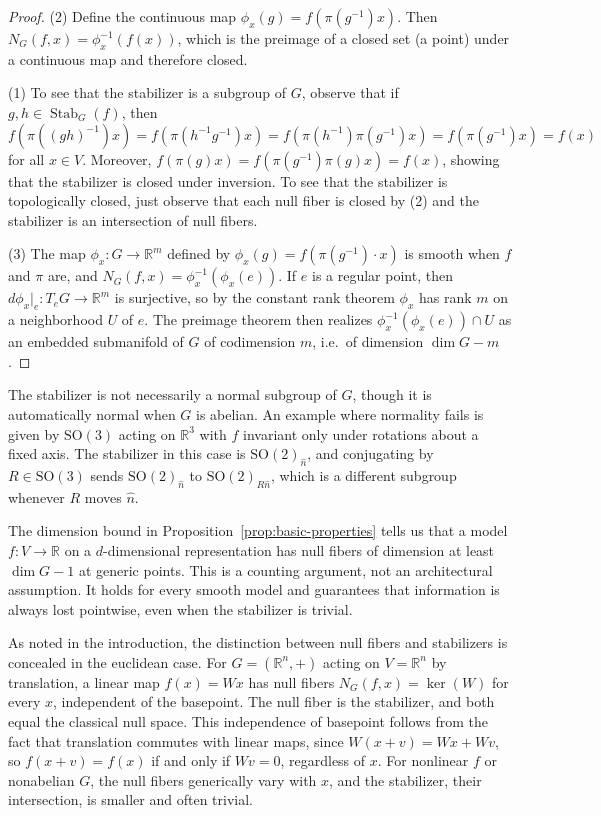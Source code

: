 \documentclass[11pt]{article}
\DeclareMathOperator{\kernel}{ker}
\DeclareMathOperator{\Stab}{Stab}
\newcommand{\RR}{\mathbb{R}}
\begin{document}
\begin{proof}
(2) Define the continuous map $\phi_x(g)=f(\pi(g^{-1})x)$. Then $N_G(f,x)=\phi_x^{-1}(f(x))$, which is the preimage of a closed set (a point) under a continuous map and therefore closed.

(1) To see that the stabilizer is a subgroup of $G$, observe that if $g,h\in\Stab_G(f)$, then $f(\pi((gh)^{-1})x)=f(\pi(h^{-1}g^{-1})x)=f(\pi(h^{-1})\pi(g^{-1})x)=f(\pi(g^{-1})x)=f(x)$ for all $x\in V$. Moreover, $f(\pi(g)x)=f(\pi(g^{-1})\pi(g)x)=f(x)$, showing that the stabilizer is closed under inversion. To see that the stabilizer is topologically closed, just observe that each null fiber is closed by (2) and the stabilizer is an intersection of null fibers.

(3) The map $\phi_x\colon G \to \RR^m$ defined by $\phi_x(g) = f(\pi(g^{-1}) \cdot x)$ is smooth when $f$ and $\pi$ are, and $N_G(f, x) = \phi_x^{-1}(\phi_x(e))$. If $e$ is a regular point, then $d\phi_x|_e\colon T_e G \to \RR^m$ is surjective, so by the constant rank theorem $\phi_x$ has rank $m$ on a neighborhood $U$ of $e$. The preimage theorem then realizes $\phi_x^{-1}(\phi_x(e)) \cap U$ as an embedded submanifold of $G$ of codimension $m$, i.e.\ of dimension $\dim G - m$.
\end{proof}

The stabilizer is not necessarily a normal subgroup of $G$, though it is automatically normal when $G$ is abelian. An example where normality fails is given by $\mathrm{SO}(3)$ acting on $\RR^3$ with $f$ invariant only under rotations about a fixed axis. The stabilizer in this case is $\mathrm{SO}(2)_{\hat{n}}$, and conjugating by $R \in \mathrm{SO}(3)$ sends $\mathrm{SO}(2)_{\hat{n}}$ to $\mathrm{SO}(2)_{R\hat{n}}$, which is a different subgroup whenever $R$ moves $\hat{n}$.

The dimension bound in Proposition~\ref{prop:basic-properties} tells us that a model $f\colon V \to \RR$ on a $d$-dimensional representation has null fibers of dimension at least $\dim G - 1$ at generic points. This is a counting argument, not an architectural assumption. It holds for every smooth model and guarantees that information is always lost pointwise, even when the stabilizer is trivial.

As noted in the introduction, the distinction between null fibers and stabilizers is concealed in the euclidean case. For $G = (\RR^n, +)$ acting on $V = \RR^n$ by translation, a linear map $f(x) = Wx$ has null fibers $N_G(f, x) = \kernel(W)$ for every $x$, independent of the basepoint. The null fiber is the stabilizer, and both equal the classical null space. This independence of basepoint follows from the fact that translation commutes with linear maps, since $W(x + v) = Wx + Wv$, so $f(x + v) = f(x)$ if and only if $Wv = 0$, regardless of $x$. For nonlinear $f$ or nonabelian $G$, the null fibers generically vary with $x$, and the stabilizer, their intersection, is smaller and often trivial.
\end{document}
